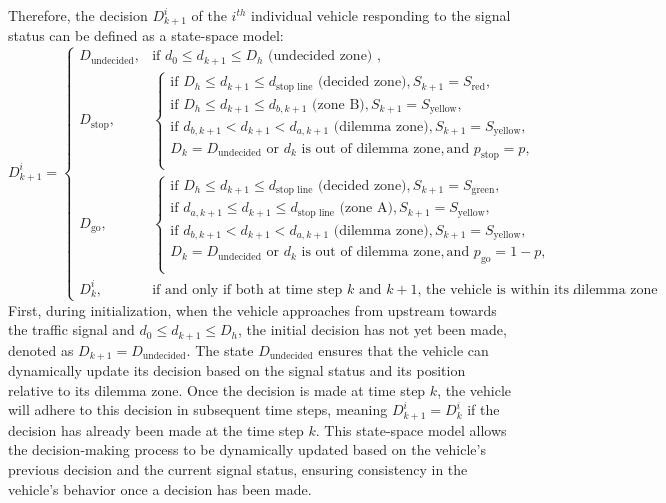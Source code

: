 Therefore, the decision $D_{k+1}^i$ of the $i^{th}$ individual vehicle responding to the signal status can be defined as a state-space model:
\begin{equation}\label{decision}
    D_{k+1}^i = 
\begin{cases} 
D_{\text{undecided}}, & \text{if } d_0 \leq d_{k+1} \leq D_h \text{ (undecided zone) },\\
D_{\text{stop}}, &  \begin{cases}
    \text{if } D_h \leq d_{k+1} \leq d_\text{stop line} \text{ (decided zone)}, S_{k+1} = S_{\text{red}}, \\
    \text{if } D_h \leq d_{k+1} \leq d_{b, k+1} \text{ (zone B)}, S_{k+1} = S_{\text{yellow}}, \\
    \text{if } d_{b, k+1} < d_{k+1} < d_{a, k+1} \text{ (dilemma zone)}, S_{k+1} = S_{\text{yellow}}, \\D_k = D_\text{undecided} \text{ or } d_k \text{ is out of dilemma zone},\text{and } p_\text{stop} = p, \\
\end{cases} \\
D_{\text{go}}, & \begin{cases}
    \text{if } D_h \leq d_{k+1} \leq d_\text{stop line} \text{ (decided zone)}, S_{k+1} = S_{\text{green}}, \\
    \text{if } d_{a, k+1} \leq d_{k+1} \leq d_\text{stop line} \text{ (zone A)}, S_{k+1} = S_{\text{yellow}}, \\
    \text{if } d_{b, k+1} < d_{k+1} < d_{a, k+1} \text{ (dilemma zone)}, S_{k+1} = S_{\text{yellow}}, \\D_k = D_\text{undecided}\text{ or } d_k \text{ is out of dilemma zone}, \text{and } p_\text{go} = 1 - p, \\
\end{cases} \\
D_{k}^i, & \text{if and only if both at time step $k$ and $k+1$, the vehicle is within its dilemma zone}.
\end{cases}
\end{equation}
First, during initialization, when the vehicle approaches from upstream towards the traffic signal and \(d_0 \leq d_{k+1} \leq D_h\), the initial decision has not yet been made, denoted as \(D_{k+1} = D_{\text{undecided}}\). The state \(D_{\text{undecided}}\) ensures that the vehicle can dynamically update its decision based on the signal status and its position relative to its dilemma zone. Once the decision is made at time step $k$, the vehicle will adhere to this decision in subsequent time steps, meaning $D_{k+1}^i = D_{k}^i$ if the decision has already been made at the time step $k$. This state-space model allows the decision-making process to be dynamically updated based on the vehicle's previous decision and the current signal status, ensuring consistency in the vehicle's behavior once a decision has been made.

